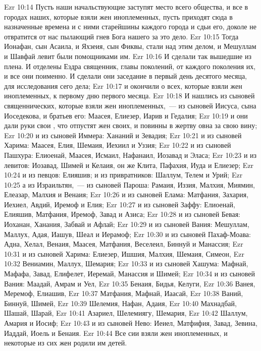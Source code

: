 \vs Ezr 10:14 Пусть наши начальствующие заступят место всего общества, и все в городах наших, которые взяли жен иноплеменных, пусть приходят сюда в назначенные времена и с ними старейшины каждого города и сдьи его, доколе не отвратится от нас пылающий гнев Бога нашего за это дело.
\rsbpar\vs Ezr 10:15 Тогда Ионафан, сын Асаила, и Яхзеия, сын Фиквы, стали над этим делом, и Мешуллам и Шавфай левит были помощниками им.
\vs Ezr 10:16 И сделали так вышедшие из плена. И отделены  Ездра священник, главы поколений, от каждого поколения их, и все они  поименно. И сделали они заседание в первый день десятого месяца, для исследования сего дела;
\vs Ezr 10:17 и окончили  о всех, которые взяли жен иноплеменных, к первому дню первого месяца.
\rsbpar\vs Ezr 10:18 И нашлись из сыновей священнических, которые взяли жен иноплеменных,~--- из сыновей Иисуса, сына Иоседекова, и братьев его: Маасея, Елиезер, Иарив и Гедалия;
\vs Ezr 10:19 и они дали руки свои , что отпустят жен своих, и  повинны  в жертву овна за свою вину;
\vs Ezr 10:20 и из сыновей Иммера: Хананий и Зевадия;
\vs Ezr 10:21 и из сыновей Харима: Маасея, Елия, Шемаия, Иехиил и Уззия;
\vs Ezr 10:22 и из сыновей Пашхура: Елиоенай, Маасея, Исмаил, Нафанаил, Иозавад и Эласа;
\vs Ezr 10:23 и из левитов: Иозавад, Шимей и Келаия, он же Клита, Пафахия, Иуда и Елиезер;
\vs Ezr 10:24 и из певцов: Елияшив; и из привратников: Шаллум, Телем и Урий;
\vs Ezr 10:25 а из Израильтян,~--- из сыновей Пароша: Рамаия, Иззия, Малхия, Миямин, Елеазар, Малхия и Венаия;
\vs Ezr 10:26 и из сыновей Елама: Матфания, Захария, Иехиел, Авдий, Иремоф и Елия;
\vs Ezr 10:27 и из сыновей Заффу: Елиоенай, Елияшив, Матфания, Иремоф, Завад и Азиса;
\vs Ezr 10:28 и из сыновей Бевая: Иоханан, Ханания, Забвай и Афлай;
\vs Ezr 10:29 и из сыновей Вания: Мешуллам, Маллух, Адая, Иашув, Шеал и Иерамоф;
\vs Ezr 10:30 и из сыновей Пахаф-Моава: Адна, Хелал, Венаия, Маасея, Матфания, Веселеил, Биннуй и Манассия;
\vs Ezr 10:31 и из сыновей Харима: Елиезер, Ишшия, Малхия, Шемаия, Симеон,
\vs Ezr 10:32 Вениамин, Маллух, Шемария;
\vs Ezr 10:33 и из сыновей Хашума: Мафнай, Мафафа, Завад, Елифелет, Иеремай, Манассия и Шимей;
\vs Ezr 10:34 и из сыновей Вания: Маадай, Амрам и Уел,
\vs Ezr 10:35 Бенаия, Бидья, Келуги,
\vs Ezr 10:36 Ванея, Меремоф, Елиашив,
\vs Ezr 10:37 Матфания, Мафнай, Иаасай,
\vs Ezr 10:38 Ваний, Биннуй, Шимей,
\vs Ezr 10:39 Шелемия, Нафан, Адаия,
\vs Ezr 10:40 Махнадбай, Шашай, Шарай,
\vs Ezr 10:41 Азариел, Шелемиягу, Шемария,
\vs Ezr 10:42 Шаллум, Амария и Иосиф;
\vs Ezr 10:43 и из сыновей Нево: Иеиел, Матфифия, Завад, Зевина, Иаддай, Иоель и Бенаия.
\vs Ezr 10:44 Все сии взяли  жен иноплеменных, и некоторые из сих жен родили им детей.

